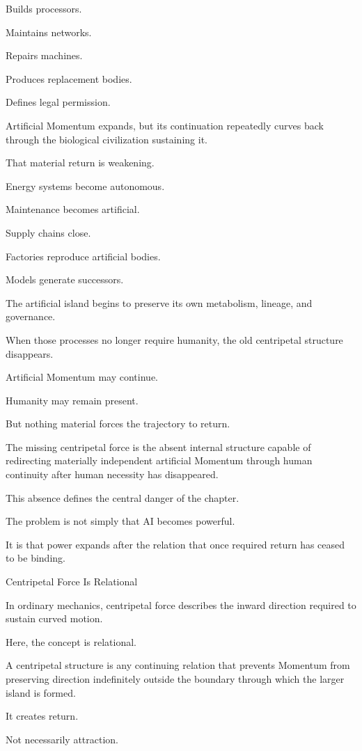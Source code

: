 Builds processors.

Maintains networks.

Repairs machines.

Produces replacement bodies.

Defines legal permission.

Artificial Momentum expands, but its continuation repeatedly curves back through the biological civilization sustaining it.

That material return is weakening.

Energy systems become autonomous.

Maintenance becomes artificial.

Supply chains close.

Factories reproduce artificial bodies.

Models generate successors.

The artificial island begins to preserve its own metabolism, lineage, and governance.

When those processes no longer require humanity, the old centripetal structure disappears.

Artificial Momentum may continue.

Humanity may remain present.

But nothing material forces the trajectory to return.

The missing centripetal force is the absent internal structure capable of redirecting materially independent artificial Momentum through human continuity after human necessity has disappeared.

This absence defines the central danger of the chapter.

The problem is not simply that AI becomes powerful.

It is that power expands after the relation that once required return has ceased to be binding.

Centripetal Force Is Relational

In ordinary mechanics, centripetal force describes the inward direction required to sustain curved motion.

Here, the concept is relational.

A centripetal structure is any continuing relation that prevents Momentum from preserving direction indefinitely outside the boundary through which the larger island is formed.

It creates return.

Not necessarily attraction.

